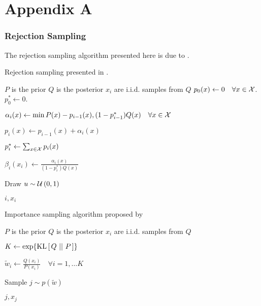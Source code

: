 \chapter{Appendix A} 

\subsection*{Rejection Sampling}
\par
The rejection sampling algorithm presented here is due to
\cite{harsha2007communication}.

\begin{algorithm}
  \caption{Rejection sampling presented in \cite{harsha2007communication}.}
  \label{alg:harsha_rej_sampling}
  \begin{algorithmic}[1]
    \Comment $P$ is the prior
    \Statex
    \Comment $Q$ is the posterior
    \Statex
    \Comment $x_i$ are i.i.d. samples from $Q$
    \State $p_0(x) \gets 0 \quad \forall x \in \mathcal{X}$.
    \State $p_0^* \gets 0$.

    \State
    $\alpha_i(x) \gets \min{P(x) - p_{i - 1}(x), (1 - p_{i - 1}^*)Q(x)}\quad
    \forall x \in \mathcal{X}$

    \State $p_i(x) \gets p_{i - 1}(x) + \alpha_i(x)$
    
    \State $p_i^* \gets \sum_{x \in \mathcal{X}}p_i(x)$

    \State $\beta_i(x_i) \gets \frac{\alpha_i(x)}{(1 - p_i^*)Q(x)}$

    \State Draw $u \sim \mathcal{U}\left( 0, 1 \right)$

    \Statex


    \State\Return $i, x_i$

    \EndIf
    
    \EndFor
    \EndProcedure
  \end{algorithmic}
\end{algorithm}

\begin{algorithm}
  \caption{Importance sampling algorithm proposed by \cite{havasi2018minimal}}
  \label{alg:miracle_imp_samp}
  \begin{algorithmic}
    \Comment $P$ is the prior
    \Statex
    \Comment $Q$ is the posterior
    \Statex
    \Comment $x_i$ are i.i.d. samples from $Q$

    \State $K \gets \exp\{\mathrm{KL}\left[\,Q\,\,||\,\,P\,\right]\}$

    \State $\tilde{w}_i \gets \frac{Q(x_i)}{P(x_i)} \quad \forall i =
    1,\hdots K$

    \State Sample $j \sim p(\tilde{w})$

    \Return $j, x_j$
    \Statex
    \EndProcedure
  \end{algorithmic}
\end{algorithm}
